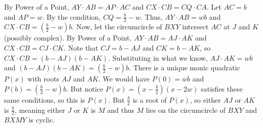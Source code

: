 By Power of a Point, $AY\cdot AB=AP\cdot AC$ and $CX\cdot CB=CQ\cdot CA$. Let $AC=b$ and $AP=w$. By the condition, $CQ=\frac{b}{2}-w$. Thus, $AY\cdot AB=wb$ and $CX\cdot CB=\left(\frac{b}{2}-w\right)b$. Now, let the circumcircle of $BXY$ intersect $AC$ at $J$ and $K$ (possibly complex). By Power of a Point, $AY\cdot AB=AJ\cdot AK$ and $CX\cdot CB=CJ\cdot CK$. Note that $CJ=b-AJ$ and $CK=b-AK$, so $CX\cdot CB=\left(b-AJ\right)\left(b-AK\right)$. Substituting in what we know, $AJ\cdot AK=wb$ and $\left(b-AJ\right)\left(b-AK\right)=\left(\frac{b}{2}-w\right)b$. There is a unique monic quadratic $P\left(x\right)$ with roots $AJ$ and $AK$. We would have $P\left(0\right)=wb$ and $P\left(b\right)=\left(\frac{b}{2}-w\right)b$. But notice $P\left(x\right)=\left(x-\frac{b}{2}\right)\left(x-2w\right)$ satisfies these same conditions, so this is $P\left(x\right)$. But $\frac{b}{2}$ is a root of $P\left(x\right)$, so either $AJ$ or $AK$ is $\frac{b}{2}$, meaning either $J$ or $K$ is $M$ and thus $M$ lies on the circumcircle of $BXY$ and $BXMY$ is cyclic.
